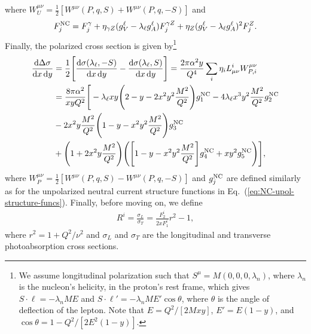 \documentclass[aps,prd,amsmath,superscriptaddress,floatfix,nofootinbib]{revtex4-2}
\newcommand{\diff}[1]{{\rm d} #1}
\newcommand{\eref}[1]{Eq.~(\ref{eq:#1})}
\begin{document}
where $W^{\mu\nu}_{U} = \frac{1}{2} [ W^{\mu\nu}(P,q,S) + W^{\mu\nu}(P,q,-S) ]$ and 
\begin{eqnarray}
\label{eq:NC-upol-structure-funcs}
    F_{j}^{\rm NC} = F_{j}^{\gamma} + \eta_{\gamma Z} (g_{V}^{\ell} - \lambda_{\ell} g_{A}^{\ell}) F_{j}^{\gamma Z} + \eta_{Z} (g_{V}^{\ell} - \lambda_{\ell} g_{A}^{\ell})^2 F_{j}^{Z}
.\end{eqnarray}
Finally, the polarized cross section is given by\footnote{We assume longitudinal polarization such that $S^{\mu} = M(0,0,0,\lambda_{n})$, where $\lambda_{n}$ is the nucleon's helicity, in the proton's rest frame, which gives $S \cdot \ell = - \lambda_{n} M E$ and $S \cdot \ell' = -\lambda_{n} M E' \cos{\theta}$, where $\theta$ is the angle of deflection of the lepton. Note that $E = Q^2/[2Mxy]$, $E' = E(1-y)$, and $\cos{\theta} = 1 - Q^2/[2E^2(1-y)]$.}
\begin{eqnarray}
    \label{eq:pol-xsec}
    \begin{aligned}    
        \frac{\diff \Delta \sigma}{\diff x \, \diff y} &= \frac{1}{2} \Bigg[ \frac{\diff \sigma(\lambda_{\ell},-S)}{\diff x \, \diff y} - \frac{\diff \sigma(\lambda_{\ell},S)}{\diff x \, \diff y} \Bigg] = \frac{2 \pi \alpha^2 y}{Q^{4}} \sum_{i} \eta_{i} L_{\mu\nu}^{i} W^{\mu\nu}_{P,i} \\
        &= \frac{8 \pi \alpha^2}{x y Q^2} \Bigg[ -\lambda_{\ell} xy \Bigg( 2 - y - 2x^2y^2 \frac{M^2}{Q^2} \Bigg) g_1^{\rm NC} - 4 \lambda_{\ell} x^3 y^2 \frac{M^2}{Q^2} g_2^{\rm NC} \\
        &- 2x^2y \frac{M^2}{Q^2} \Bigg( 1 - y - x^2y^2 \frac{M^2}{Q^2} \Bigg) g_3^{\rm NC} \\
        &+ \Bigg( 1 + 2x^2y \frac{M^2}{Q^2} \Bigg) \Bigg( \Bigg[ 1 - y - x^2y^2 \frac{M^2}{Q^2} \Bigg] g_4^{\rm NC} + xy^2 g_5^{\rm NC} \Bigg) \Bigg] 
    ,\end{aligned}
\end{eqnarray}
where $W^{\mu\nu}_{P} = \frac{1}{2} [ W^{\mu\nu}(P,q,S) - W^{\mu\nu}(P,q,-S) ]$ and $g^{\rm NC}_{j}$ are defined similarly as for the unpolarized neutral current structure functions in \eref{NC-upol-structure-funcs}.
Finally, before moving on, we define
\begin{eqnarray}
    \label{eq:ratio}
    R^{i} = \frac{\sigma_{L}}{\sigma_{T}} = \frac{F_{2}^{i}}{2xF_{1}^{i}} r^2 - 1
,\end{eqnarray}
where $r^2 = 1 + Q^2/\nu^2$ and $\sigma_{L}$ and $\sigma_{T}$ are the longitudinal and transverse photoabsorption cross sections.
\end{document}
